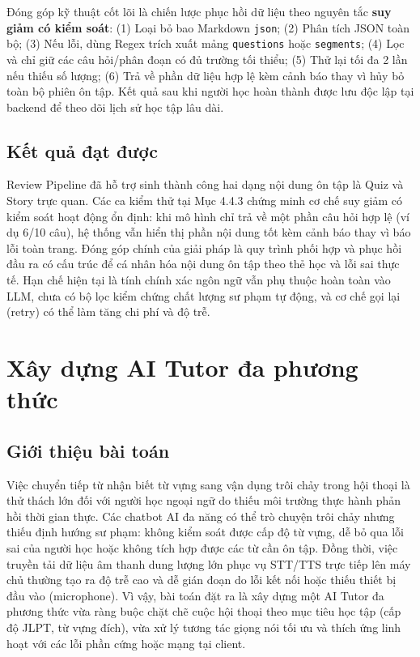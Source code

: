 \documentclass[../DoAn.tex]{subfiles}
\begin{document}
Đóng góp kỹ thuật cốt lõi là chiến lược phục hồi dữ liệu theo nguyên tắc \textbf{suy giảm có kiểm soát}: (1) Loại bỏ bao Markdown \texttt{json}; (2) Phân tích JSON toàn bộ; (3) Nếu lỗi, dùng Regex trích xuất mảng \texttt{questions} hoặc \texttt{segments}; (4) Lọc và chỉ giữ các câu hỏi/phân đoạn có đủ trường tối thiểu; (5) Thử lại tối đa 2 lần nếu thiếu số lượng; (6) Trả về phần dữ liệu hợp lệ kèm cảnh báo thay vì hủy bỏ toàn bộ phiên ôn tập. Kết quả sau khi người học hoàn thành được lưu độc lập tại backend để theo dõi lịch sử học tập lâu dài.

\subsection{Kết quả đạt được}
\label{subsection:5.3.3}

Review Pipeline đã hỗ trợ sinh thành công hai dạng nội dung ôn tập là Quiz và Story trực quan. Các ca kiểm thử tại Mục 4.4.3 chứng minh cơ chế suy giảm có kiểm soát hoạt động ổn định: khi mô hình chỉ trả về một phần câu hỏi hợp lệ (ví dụ 6/10 câu), hệ thống vẫn hiển thị phần nội dung tốt kèm cảnh báo thay vì báo lỗi toàn trang. Đóng góp chính của giải pháp là quy trình phối hợp và phục hồi đầu ra có cấu trúc để cá nhân hóa nội dung ôn tập theo thẻ học và lỗi sai thực tế. Hạn chế hiện tại là tính chính xác ngôn ngữ vẫn phụ thuộc hoàn toàn vào LLM, chưa có bộ lọc kiểm chứng chất lượng sư phạm tự động, và cơ chế gọi lại (retry) có thể làm tăng chi phí và độ trễ.

\section{Xây dựng AI Tutor đa phương thức}
\label{section:5.4}

\subsection{Giới thiệu bài toán}
\label{subsection:5.4.1}

Việc chuyển tiếp từ nhận biết từ vựng sang vận dụng trôi chảy trong hội thoại là thử thách lớn đối với người học ngoại ngữ do thiếu môi trường thực hành phản hồi thời gian thực. Các chatbot AI đa năng có thể trò chuyện trôi chảy nhưng thiếu định hướng sư phạm: không kiểm soát được cấp độ từ vựng, dễ bỏ qua lỗi sai của người học hoặc không tích hợp được các từ cần ôn tập. Đồng thời, việc truyền tải dữ liệu âm thanh dung lượng lớn phục vụ STT/TTS trực tiếp lên máy chủ thường tạo ra độ trễ cao và dễ gián đoạn do lỗi kết nối hoặc thiếu thiết bị đầu vào (microphone). Vì vậy, bài toán đặt ra là xây dựng một AI Tutor đa phương thức vừa ràng buộc chặt chẽ cuộc hội thoại theo mục tiêu học tập (cấp độ JLPT, từ vựng đích), vừa xử lý tương tác giọng nói tối ưu và thích ứng linh hoạt với các lỗi phần cứng hoặc mạng tại client.
\end{document}
